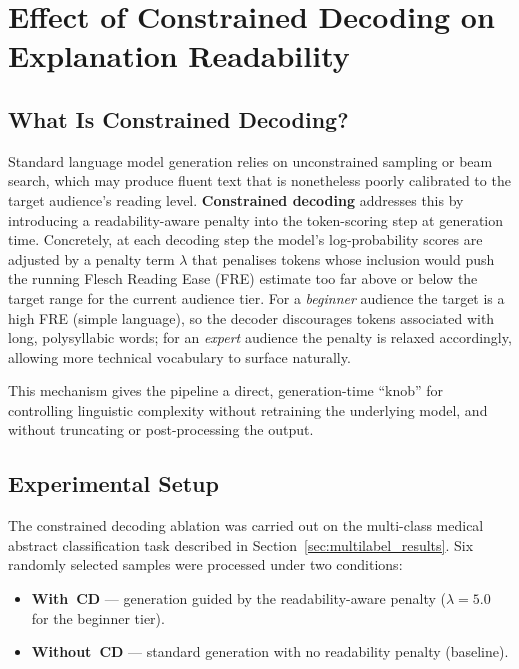 \section{Effect of Constrained Decoding on Explanation Readability}
\label{sec:constrained_decoding_results}

\subsection{What Is Constrained Decoding?}

Standard language model generation relies on unconstrained sampling or beam search, which may produce fluent text that is nonetheless poorly calibrated to the target audience's reading level. \textbf{Constrained decoding} addresses this by introducing a readability-aware penalty into the token-scoring step at generation time. Concretely, at each decoding step the model's log-probability scores are adjusted by a penalty term $\lambda$ that penalises tokens whose inclusion would push the running Flesch Reading Ease (FRE) estimate too far above or below the target range for the current audience tier. For a \emph{beginner} audience the target is a high FRE (simple language), so the decoder discourages tokens associated with long, polysyllabic words; for an \emph{expert} audience the penalty is relaxed accordingly, allowing more technical vocabulary to surface naturally.

This mechanism gives the pipeline a direct, generation-time ``knob'' for controlling linguistic complexity without retraining the underlying model, and without truncating or post-processing the output.

\subsection{Experimental Setup}

The constrained decoding ablation was carried out on the multi-class medical abstract classification task described in Section~\ref{sec:multilabel_results}. Six randomly selected samples were processed under two conditions:

\begin{itemize}
    \item \textbf{With~CD} --- generation guided by the readability-aware penalty ($\lambda = 5.0$ for the beginner tier).
    \item \textbf{Without~CD} --- standard generation with no readability penalty (baseline).
\end{itemize}

